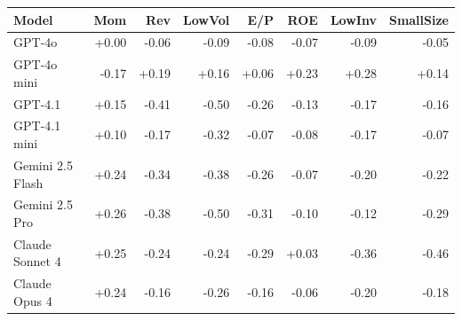 \begin{tabular}{l rrrrrrr}
\toprule
\textbf{Model} & Mom & Rev & LowVol & E/P & ROE & LowInv & SmallSize \\
\midrule
GPT-4o & +0.00 & -0.06 & -0.09 & -0.08 & -0.07 & -0.09 & -0.05 \\
GPT-4o mini & -0.17 & +0.19 & +0.16 & +0.06 & +0.23 & +0.28 & +0.14 \\
GPT-4.1 & +0.15 & -0.41 & -0.50 & -0.26 & -0.13 & -0.17 & -0.16 \\
GPT-4.1 mini & +0.10 & -0.17 & -0.32 & -0.07 & -0.08 & -0.17 & -0.07 \\
Gemini 2.5 Flash & +0.24 & -0.34 & -0.38 & -0.26 & -0.07 & -0.20 & -0.22 \\
Gemini 2.5 Pro & +0.26 & -0.38 & -0.50 & -0.31 & -0.10 & -0.12 & -0.29 \\
Claude Sonnet 4 & +0.25 & -0.24 & -0.24 & -0.29 & +0.03 & -0.36 & -0.46 \\
Claude Opus 4 & +0.24 & -0.16 & -0.26 & -0.16 & -0.06 & -0.20 & -0.18 \\
\bottomrule
\end{tabular}
